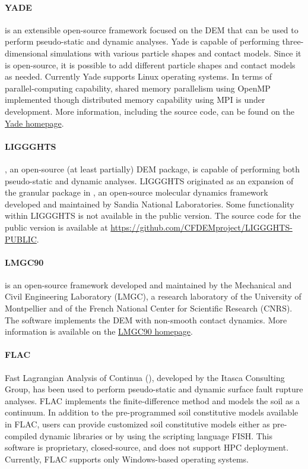 \paragraph{YADE}
 is an extensible open-source framework focused on the DEM \citep{yade2005doc} that can be used to perform pseudo-static and dynamic analyses. Yade is capable of performing three-dimensional simulations with various particle shapes and contact models. Since it is open-source, it is possible to add different particle shapes and contact models as needed. Currently Yade supports Linux operating systems. In terms of parallel-computing capability, shared memory parallelism using OpenMP implemented though distributed memory capability using MPI is under development. More information, including the source code, can be found on the \href{https://yade-dem.org/doc/}{Yade homepage}.

\paragraph{LIGGGHTS}
, an open-source (at least partially) DEM package, is capable of performing both pseudo-static and dynamic analyses. LIGGGHTS originated as an expansion of the granular package in , an open-source molecular dynamics framework developed and maintained by Sandia National Laboratories. Some functionality within LIGGGHTS is not available in the public version. The source code for the public version is available at \url{https://github.com/CFDEMproject/LIGGGHTS-PUBLIC}.

\paragraph{LMGC90}
 is an open-source framework developed and maintained by the Mechanical and Civil Engineering Laboratory (LMGC), a research laboratory of the University of Montpellier and of the French National Center for Scientific Research (CNRS). The software implements the DEM with non-smooth contact dynamics. More information is available on the \href{http://mimetics-engineering.fr/index.php/en/lmgc90-2/}{LMGC90 homepage}.

\paragraph{FLAC}
Fast Lagrangian Analysis of Continua (), developed by the Itasca Consulting Group, has been used to perform pseudo-static and dynamic surface fault rupture analyses. FLAC implements the finite-difference method and models the soil as a continuum. In addition to the pre-programmed soil constitutive models available in FLAC, users can provide customized soil constitutive models either as pre-compiled dynamic libraries or by using the scripting language FISH. This software is proprietary, closed-source, and does not support HPC deployment. Currently, FLAC supports only Windows-based operating systems.

